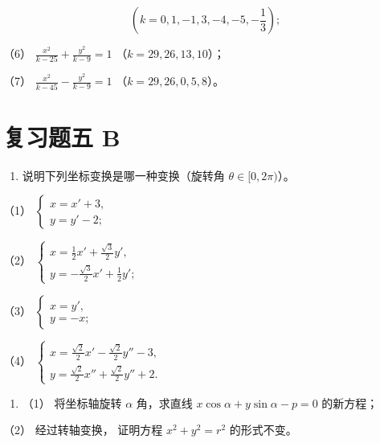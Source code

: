 \[
\left(k = 0, 1, - 1, 3, - 4, - 5, - \frac {1}{3}\right);
\]

（6） \(\frac{x^2}{k - 25} + \frac{y^2}{k - 9} = 1\)
（\(k = 29, 26, 13, 10\)）；

（7） \(\frac{x^2}{k - 45} - \frac{y^2}{k - 9} = 1\)
（\(k = 29, 26, 0, 5, 8\)）。

\section{复习题五 B}\label{ux590dux4e60ux9898ux4e94-b}

\begin{enumerate}
\def\labelenumi{\arabic{enumi}.}
\tightlist
\item
  说明下列坐标变换是哪一种变换（旋转角 \(\theta \in [0, 2\pi)\)）。
\end{enumerate}

（1）
\(\left\{ \begin{array}{l} x = x' + 3, \\ y = y' - 2; \end{array} \right.\)

（2）
\(\left\{ \begin{array}{l} x = \frac{1}{2} x' + \frac{\sqrt{3}}{2} y', \\ y = -\frac{\sqrt{3}}{2} x' + \frac{1}{2} y'; \end{array} \right.\)

（3）
\(\left\{ \begin{array}{l} x = y', \\ y = -x; \end{array} \right.\)

（4）
\(\left\{ \begin{array}{l} x = \frac{\sqrt{2}}{2} x' - \frac{\sqrt{2}}{2} y'' - 3, \\ y = \frac{\sqrt{2}}{2} x'' + \frac{\sqrt{2}}{2} y'' + 2. \end{array} \right.\)

\begin{enumerate}
\def\labelenumi{\arabic{enumi}.}
\setcounter{enumi}{1}
\tightlist
\item
  （1） 将坐标轴旋转 \(\alpha\) 角，求直线
  \(x \cos \alpha + y \sin \alpha - p = 0\) 的新方程；
\end{enumerate}

（2） 经过转轴变换， 证明方程 \(x^{2} + y^{2} = r^{2}\) 的形式不变。

